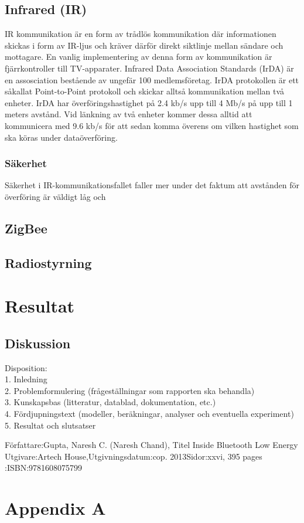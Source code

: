 \documentclass[a4paper,12pt,fleqn]{article}
\begin{document}
\subsection{Infrared (IR)}
IR kommunikation är en form av trådlös kommunikation där informationen skickas i form av IR-ljus och kräver därför direkt siktlinje mellan sändare och mottagare. En vanlig implementering av denna form av kommunikation är fjärrkontroller till TV-apparater.
Infrared Data Association Standards (IrDA) är en assosciation bestående av ungefär 100 medlemsföretag. IrDA protokollen är ett såkallat Point-to-Point protokoll och skickar alltså kommunikation mellan två enheter. IrDA har överföringshastighet på 2.4 kb/s upp till 4 Mb/s på upp till 1 meters avstånd. Vid länkning av två enheter kommer dessa alltid att kommunicera med 9.6 kb/s för att sedan komma överens om vilken hastighet som ska köras under dataöverföring.  

\subsubsection{Säkerhet}
Säkerhet i IR-kommunikationsfallet faller mer under det faktum att avstånden för överföring är väldigt låg och 

\subsection{ZigBee}
\subsection{Radiostyrning}
\section{Resultat}
\subsection{Diskussion}

Disposition: 
\\
1. Inledning 
\\
2. Problemformulering (frågeställningar som rapporten ska behandla) 
\\
3. Kunskapsbas (litteratur, datablad, dokumentation, etc.) 
\\
4. Fördjupningstext (modeller, beräkningar, analyser och eventuella experiment) 
\\
5. Resultat och slutsatser 






\newpage
\appendix
Författare:Gupta, Naresh C. (Naresh Chand), Titel Inside Bluetooth Low Energy Utgivare:Artech House,Utgivningsdatum:cop. 2013Sidor:xxvi, 395 pages :ISBN:9781608075799
\pagestyle{empty}
\section{Appendix A}
\end{document}
